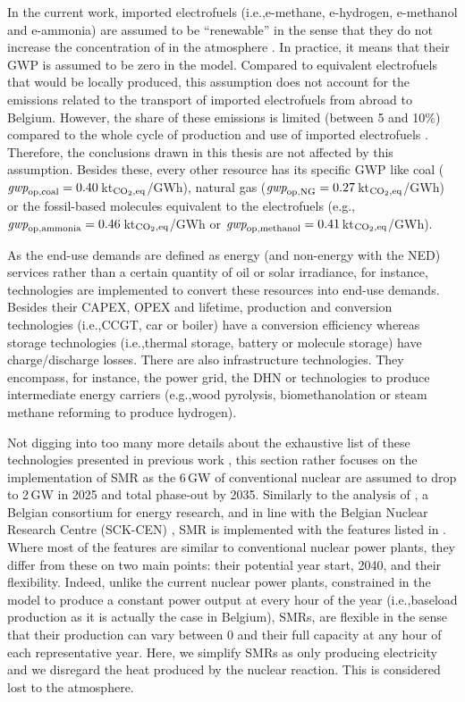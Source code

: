 \documentclass[11pt,twoside,a4paper,english]{article}
\def\eg{e.g.,}
\def\ie{i.e.,}
\begin{document}
\begin{appendices}
In the current work, imported electrofuels (\ie e-methane, e-hydrogen, e-methanol and e-ammonia) are assumed to be ``renewable'' in the sense that they do not increase the concentration of  in the atmosphere \cite{rixhon2021terminology}. In practice, it means that their \gls{GWP} is assumed to be zero in the model. Compared to equivalent electrofuels that would be locally produced, this assumption does not account for the emissions related to the transport of imported electrofuels from abroad to Belgium. However, the share of these emissions is limited (between 5 and 10\%) compared to the whole cycle of production and use of imported electrofuels \cite{coppitters2024towards}. Therefore, the conclusions drawn in this thesis are not affected by this assumption. Besides these, every other resource has its specific \gls{GWP} like coal ($\emph{gwp}_{\mathrm{op,coal}}=0.40$\,kt$_{\ce{CO2},\text{eq}}$/GWh), natural gas ($\emph{gwp}_{\mathrm{op,NG}}=0.27$\,kt$_{\ce{CO2},\text{eq}}$/GWh) or the fossil-based molecules equivalent to the electrofuels (\eg $\emph{gwp}_{\mathrm{op,ammonia}}=0.46$\,kt$_{\ce{CO2},\text{eq}}$/GWh or $\emph{gwp}_{\mathrm{op,methanol}}=0.41$\,kt$_{\ce{CO2},\text{eq}}$/GWh).

As the end-use demands are defined as energy (and non-energy with the \gls{NED}) services rather than a certain quantity of oil or solar irradiance, for instance, technologies are implemented to convert these resources into end-use demands. Besides their CAPEX, OPEX and lifetime, production and conversion technologies (\ie \gls{CCGT}, car or boiler) have a conversion efficiency whereas storage technologies (\ie thermal storage, battery or molecule storage) have charge/discharge losses. There are also infrastructure technologies. They encompass, for instance, the power grid, the \gls{DHN} or technologies to produce intermediate energy carriers (\eg wood pyrolysis, biomethanolation or steam methane reforming to produce hydrogen). 

Not digging into too many more details about the exhaustive list of these technologies presented in previous work \cite{limpens2021generating}, this section rather focuses on the implementation of \gls{SMR} as the 6\,GW of conventional nuclear are assumed to drop to 2\,GW in 2025 and total phase-out by 2035. Similarly to the analysis of \citet{PATHS2050}, a Belgian consortium for energy research, and in line with the Belgian Nuclear Research Centre (SCK-CEN) \cite{SCK-CEN_SMR}, \gls{SMR} is implemented with the features listed in . Where most of the features are similar to conventional nuclear power plants, they differ from these on two main points: their potential year start, 2040, and their flexibility. Indeed, unlike the current nuclear power plants, constrained in the model to produce a constant power output at every hour of the year (\ie baseload production as it is actually the case in Belgium), SMRs, are flexible in the sense that their production can vary between 0 and their full capacity at any hour of each representative year. Here, we simplify SMRs as only producing electricity and we disregard the heat produced by the nuclear reaction. This is considered lost to the atmosphere.


\end{appendices}
\end{document}
